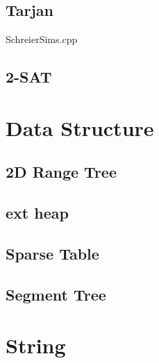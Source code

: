 \subsection{Tarjan}


SchreierSims.cpp
\subsection{2-SAT}



\section{Data Structure}

\subsection{2D Range Tree}

\subsection{ext heap}

%
%
\subsection{Sparse Table}

%
\subsection{Segment Tree}



\section{String}

